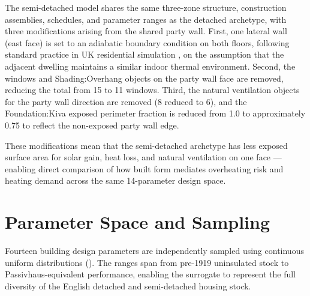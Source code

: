 \documentclass[12pt,a4paper]{report}
\begin{document}
The semi-detached model shares the same three-zone structure, construction assemblies, schedules, and parameter ranges as the detached archetype, with three modifications arising from the shared party wall. First, one lateral wall (east face) is set to an adiabatic boundary condition on both floors, following standard practice in UK residential simulation \citep{Shatat2015}, on the assumption that the adjacent dwelling maintains a similar indoor thermal environment. Second, the windows and Shading:Overhang objects on the party wall face are removed, reducing the total from 15 to 11 windows. Third, the natural ventilation objects for the party wall direction are removed (8 reduced to 6), and the Foundation:Kiva exposed perimeter fraction is reduced from 1.0 to approximately 0.75 to reflect the non-exposed party wall edge.

These modifications mean that the semi-detached archetype has less exposed surface area for solar gain, heat loss, and natural ventilation on one face --- enabling direct comparison of how built form mediates overheating risk and heating demand across the same 14-parameter design space.


\section{Parameter Space and Sampling}
\label{sec:parameters}

Fourteen building design parameters are independently sampled using continuous uniform distributions (). The ranges span from pre-1919 uninsulated stock to Passivhaus-equivalent performance, enabling the surrogate to represent the full diversity of the English detached and semi-detached housing stock.
\end{document}
